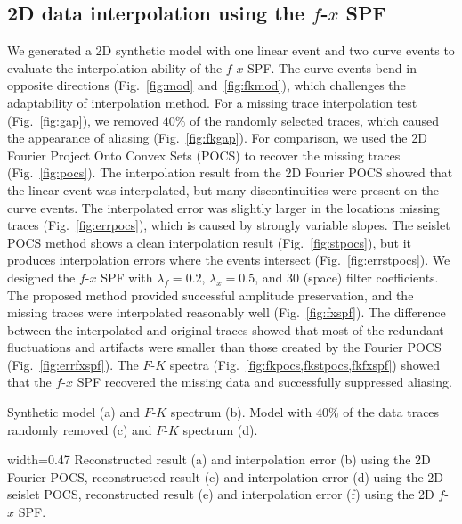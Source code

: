\subsection{2D data interpolation using the $f$-$x$ SPF}

We generated a 2D synthetic model with one linear event and two curve
events to evaluate the interpolation ability of the $f$-$x$ SPF.  The
curve events bend in opposite directions (Fig.~\ref{fig:mod}
and~\ref{fig:fkmod}), which challenges the adaptability of
interpolation method.  For a missing trace interpolation test
(Fig.~\ref{fig:gap}), we removed $40\%$ of the randomly selected
traces, which caused the appearance of aliasing
(Fig.~\ref{fig:fkgap}).  For comparison, we used the 2D Fourier
Project Onto Convex Sets (POCS) to recover the missing traces
(Fig.~\ref{fig:pocs}). The interpolation result from the 2D Fourier
POCS showed that the linear event was interpolated, but many
discontinuities were present on the curve events.  The interpolated
error was slightly larger in the locations missing traces
(Fig.~\ref{fig:errpocs}), which is caused by strongly variable slopes.
The seislet POCS method \citep{Gan16} shows a clean interpolation
result (Fig.~\ref{fig:stpocs}), but it produces interpolation errors
where the events intersect (Fig.~\ref{fig:errstpocs}).  We designed
the $f$-$x$ SPF with $\lambda_{f}=0.2$, $\lambda_{x}=0.5$, and 30
(space) filter coefficients.  The proposed method provided successful
amplitude preservation, and the missing traces were interpolated
reasonably well (Fig.~\ref{fig:fxspf}).  The difference between the
interpolated and original traces showed that most of the redundant
fluctuations and artifacts were smaller than those created by the
Fourier POCS (Fig.~\ref{fig:errfxspf}).  The $F$-$K$ spectra
(Fig.~\ref{fig:fkpocs,fkstpocs,fkfxspf}) showed that the $f$-$x$ SPF
recovered the missing data and successfully suppressed aliasing.

 {Synthetic
  model (a) and $F$-$K$ spectrum (b).  Model with $40\%$ of the data
  traces randomly removed (c) and $F$-$K$ spectrum (d).}

{width=0.47\columnwidth} {Reconstructed result (a) and interpolation
  error (b) using the 2D Fourier POCS, reconstructed result (c) and
  interpolation error (d) using the 2D seislet POCS, reconstructed
  result (e) and interpolation error (f) using the 2D $f$-$x$ SPF.}

